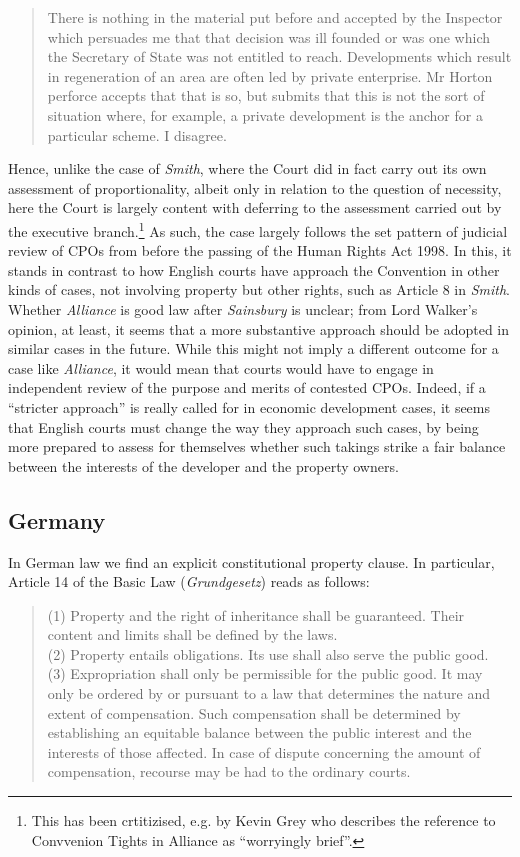 \begin{quote}
There is nothing in the material put before and accepted by the Inspector which persuades me that that decision was ill founded or was one which the Secretary of State was not entitled to reach. Developments which result in regeneration of an area are often led by private enterprise. Mr Horton perforce accepts that that is so, but submits that this is not the sort of situation where, for example, a private development is the anchor for a particular scheme. I disagree. 
\end{quote}

Hence, unlike the case of {\it Smith}, where the Court did in fact carry out its own assessment of proportionality, albeit only in relation to the question of necessity, here the Court is largely content with deferring to the assessment carried out by the executive branch.\footnote{This has been crtitizised, e.g. by Kevin Grey who describes the reference to Convvenion Tights in Alliance as ``worryingly brief''.} As such, the case largely follows the set pattern of judicial review of CPOs from before the passing of the Human Rights Act 1998. In this, it stands in contrast to how English courts have approach the Convention in other kinds of cases, not involving property but other rights, such as Article 8 in {\it Smith}. Whether {\it Alliance} is good law after {\it Sainsbury} is unclear; from Lord Walker's opinion, at least, it seems that a more substantive approach should be adopted in similar cases in the future. While this might not imply a different outcome for a case like {\it Alliance}, it would mean that courts would have to engage in independent review of the purpose and merits of contested CPOs. Indeed, if a ``stricter approach'' is really called for in economic development cases, it seems that English courts must change the way they approach such cases, by being more prepared to assess for themselves whether such takings strike a fair balance between the interests of the developer and the property owners.

\subsection{Germany}

In German law we find an explicit constitutional property clause. In particular, Article 14 of the Basic Law ({\it Grundgesetz}) reads as follows:

\begin{quote}
(1) Property and the right of inheritance shall be guaranteed. Their content and limits shall be defined by the laws. \\
(2) Property entails obligations. Its use shall also serve the public good. \\
(3) Expropriation shall only be permissible for the public good. It may only be ordered by or pursuant to a law that determines the nature and extent of compensation. Such compensation shall be determined by establishing an equitable balance between the public interest and the interests of those affected. In case of dispute concerning the amount of compensation, recourse may be had to the ordinary courts.
\end{quote}

